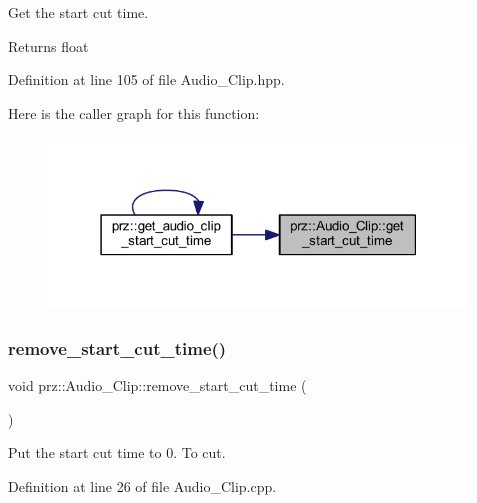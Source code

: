 Get the start cut time. 

\begin{DoxyReturn}{Returns}
float 
\end{DoxyReturn}


Definition at line 105 of file Audio\+\_\+\+Clip.\+hpp.

Here is the caller graph for this function\+:
\nopagebreak
\begin{figure}[H]
\begin{center}
\leavevmode
\includegraphics[width=316pt]{classprz_1_1_audio___clip_a0000a44ffec1e064301fd93750806aab_icgraph}
\end{center}
\end{figure}
\mbox{\label{classprz_1_1_audio___clip_a07044f0528a26e2fe0afb5d7c645f13d}} 
\subsubsection{\texorpdfstring{remove\_start\_cut\_time()}{remove\_start\_cut\_time()}}
{\footnotesize\ttfamily void prz\+::\+Audio\+\_\+\+Clip\+::remove\+\_\+start\+\_\+cut\+\_\+time (\begin{DoxyParamCaption}{ }\end{DoxyParamCaption})}



Put the start cut time to 0. To cut. 



Definition at line 26 of file Audio\+\_\+\+Clip.\+cpp.

\mbox{\label{classprz_1_1_audio___clip_ab45f2a30cf63261040e4212af3dc08d7}} 
